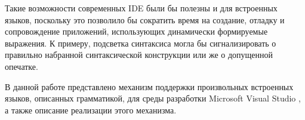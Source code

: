 Такие возможности современных IDE были бы полезны и для встроенных языков, поскольку это позволило бы сократить время на создание, отладку и сопровождение приложений, использующих динамически формируемые выражения.  К примеру, подсветка синтаксиса могла бы сигнализировать о правильно набранной синтаксической конструкции или же о допущенной опечатке. 

В данной работе представлено механизм поддержки произвольных встроенных языков, описанных грамматикой, для среды разработки Microsoft Visual Studio \cite{MSVisualStudio}, а также описание реализации этого механизма. 
